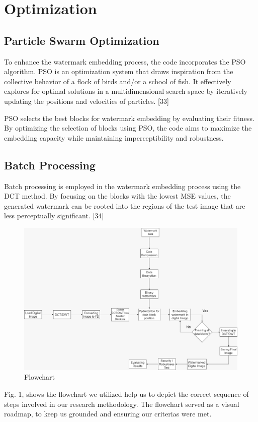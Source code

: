 \documentclass[conference]{IEEEtran}
\begin{document}
\section{Optimization}
\subsection{Particle Swarm Optimization}
To enhance the watermark embedding process, the code incorporates the PSO algorithm. PSO is an optimization system that draws inspiration from the collective behavior of a flock of birds and/or a school of fish. It effectively explores for optimal solutions in a multidimensional search space by iteratively updating the positions and velocities of particles. [33]

PSO selects the best blocks for watermark embedding by evaluating their fitness. By optimizing the selection of blocks using PSO, the code aims to maximize the embedding capacity while maintaining imperceptibility and robustness.


\subsection{Batch Processing}
Batch processing is employed in the watermark embedding process using the DCT method. By focusing on the blocks with the lowest MSE values, the generated watermark can be rooted into the regions of the test image that are less perceptually significant. [34]

\begin{figure}[htbp]
\centering
\includegraphics[width=0.9\columnwidth]{Flowchart.jpg}
\caption{Flowchart}
\label{fig}
\end{figure}
Fig. 1, shows the flowchart we utilized help us to depict the correct sequence of steps involved in our research methodology. The flowchart served as a visual roadmap, to keep us grounded and ensuring our criterias were met.
\end{document}
